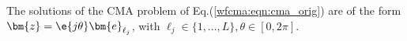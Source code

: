 The solutions of the CMA problem of Eq.(\ref{wfcma:eqn:cma_orig}) are of the form $\bm{z}=\e{j\theta}\bm{e}_{\ell_j}$, with  $\ell_j\in\{1,\ldots,L\}, \theta\in[0,2\pi]$. 
%


